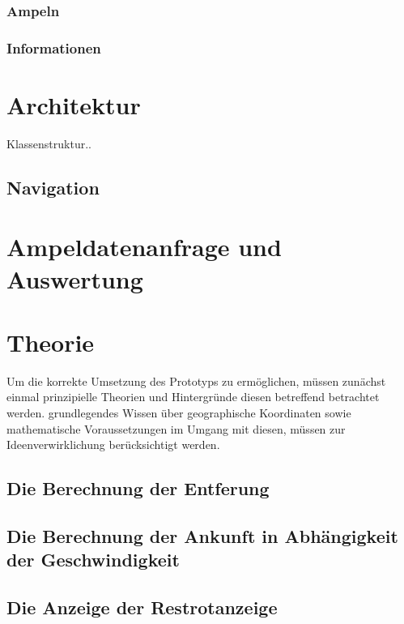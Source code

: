 \subsubsection{Ampeln}
\subsubsection{Informationen}
\section{Architektur}
Klassenstruktur..
\subsection{Navigation}
\section{Ampeldatenanfrage und Auswertung}
\section{Theorie}
Um die korrekte Umsetzung des Prototyps zu ermöglichen, müssen zunächst einmal prinzipielle
Theorien und Hintergründe diesen betreffend betrachtet werden.
grundlegendes Wissen über geographische Koordinaten sowie mathematische Voraussetzungen im Umgang mit diesen, müssen zur Ideenverwirklichung berücksichtigt werden.
\subsection{Die Berechnung der Entferung}
\subsection{Die Berechnung der Ankunft in Abhängigkeit der Geschwindigkeit}
\subsection{Die Anzeige der Restrotanzeige}
